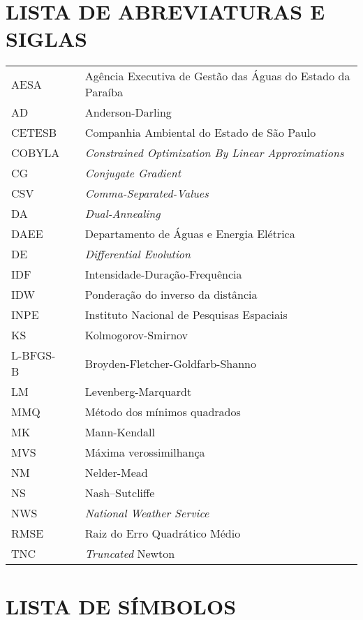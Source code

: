 \chapter*{LISTA DE ABREVIATURAS E SIGLAS}
\thispagestyle{empty}
\begin{table}[h!]
	\flushleft
	\renewcommand{\arraystretch}{1.8}
	\begin{tabular}{lcl}
AESA && Agência Executiva de Gestão das Águas do Estado da Paraíba\\
AD &&Anderson-Darling\\
CETESB &&Companhia Ambiental do Estado de São Paulo\\
COBYLA &&\textit{Constrained Optimization By Linear Approximations}\\
CG &&\textit{Conjugate Gradient}\\
CSV &&\textit{Comma-Separated-Values}\\
DA &&\textit{Dual-Annealing}\\
DAEE &&Departamento de Águas e Energia Elétrica\\
DE &&\textit{Differential Evolution}\\
IDF &&Intensidade-Duração-Frequência\\
IDW &&Ponderação do inverso da distância\\
INPE &&Instituto Nacional de Pesquisas Espaciais\\
KS &&Kolmogorov-Smirnov\\
L-BFGS-B &&Broyden-Fletcher-Goldfarb-Shanno\\
LM &&Levenberg-Marquardt\\
MMQ &&Método dos mínimos quadrados\\
MK &&Mann-Kendall\\
MVS &&Máxima verossimilhança\\
NM &&Nelder-Mead\\
NS &&Nash–Sutcliffe\\
NWS &&\textit{National Weather Service}\\
RMSE &&Raiz do Erro Quadrático Médio\\
TNC &&\textit{Truncated} Newton\\

\end{tabular} 
\end{table}
\newpage

\chapter*{LISTA DE SÍMBOLOS}
\thispagestyle{empty}

